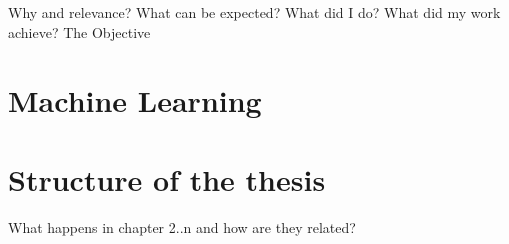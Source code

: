 
Why and relevance?
What can be expected?
What did I do?
What did my work achieve?
The Objective

\section{Machine Learning}
\section{Structure of the thesis}
  What happens in chapter 2..n and how are they related?
